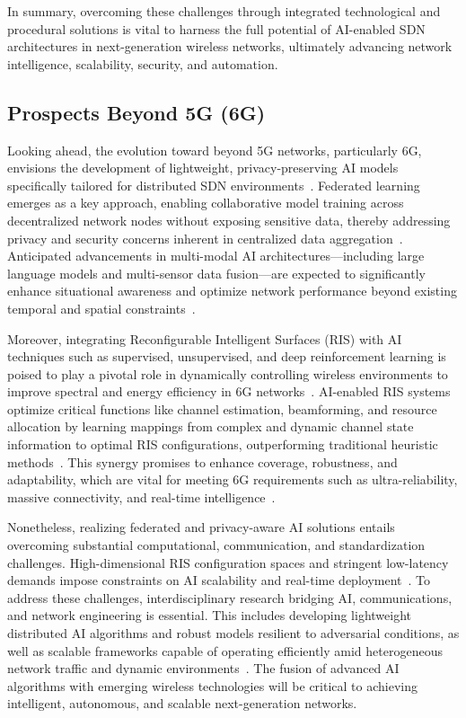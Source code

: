 \documentclass[sigconf]{acmart}
\begin{document}
In summary, overcoming these challenges through integrated technological and procedural solutions is vital to harness the full potential of AI-enabled SDN architectures in next-generation wireless networks, ultimately advancing network intelligence, scalability, security, and automation.

\subsection{Prospects Beyond 5G (6G)}

Looking ahead, the evolution toward beyond 5G networks, particularly 6G, envisions the development of lightweight, privacy-preserving AI models specifically tailored for distributed SDN environments~\cite{ref49,ref50}. Federated learning emerges as a key approach, enabling collaborative model training across decentralized network nodes without exposing sensitive data, thereby addressing privacy and security concerns inherent in centralized data aggregation~\cite{ref52}. Anticipated advancements in multi-modal AI architectures—including large language models and multi-sensor data fusion—are expected to significantly enhance situational awareness and optimize network performance beyond existing temporal and spatial constraints~\cite{ref52}.

Moreover, integrating Reconfigurable Intelligent Surfaces (RIS) with AI techniques such as supervised, unsupervised, and deep reinforcement learning is poised to play a pivotal role in dynamically controlling wireless environments to improve spectral and energy efficiency in 6G networks~\cite{ref49}. AI-enabled RIS systems optimize critical functions like channel estimation, beamforming, and resource allocation by learning mappings from complex and dynamic channel state information to optimal RIS configurations, outperforming traditional heuristic methods~\cite{ref49}. This synergy promises to enhance coverage, robustness, and adaptability, which are vital for meeting 6G requirements such as ultra-reliability, massive connectivity, and real-time intelligence~\cite{ref49}.

Nonetheless, realizing federated and privacy-aware AI solutions entails overcoming substantial computational, communication, and standardization challenges. High-dimensional RIS configuration spaces and stringent low-latency demands impose constraints on AI scalability and real-time deployment~\cite{ref49,ref50}. To address these challenges, interdisciplinary research bridging AI, communications, and network engineering is essential. This includes developing lightweight distributed AI algorithms and robust models resilient to adversarial conditions, as well as scalable frameworks capable of operating efficiently amid heterogeneous network traffic and dynamic environments~\cite{ref49,ref50,ref52}. The fusion of advanced AI algorithms with emerging wireless technologies will be critical to achieving intelligent, autonomous, and scalable next-generation networks.
\end{document}
